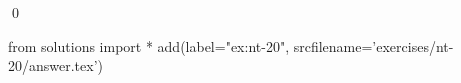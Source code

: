 
\begin{ex} 
  \label{ex:nt-20}
  
  \qed
\end{ex} 
\begin{python0}
from solutions import *
add(label="ex:nt-20",
    srcfilename='exercises/nt-20/answer.tex') 
\end{python0}
